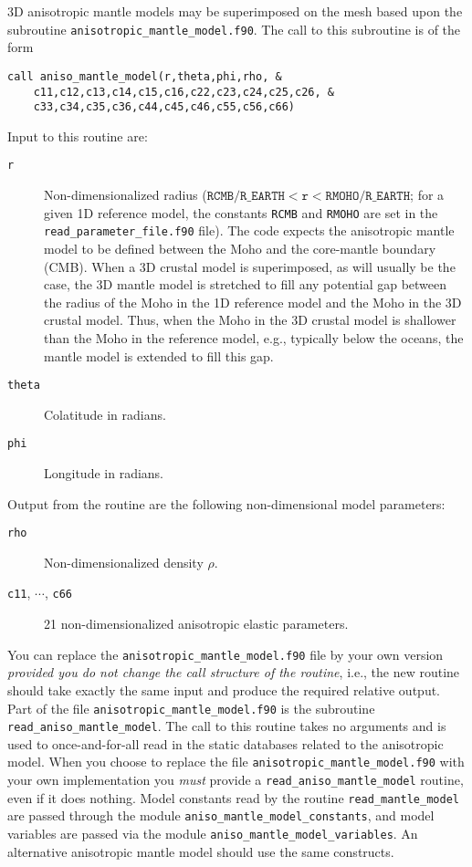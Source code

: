 \documentclass[onecolumn]{article}
\begin{document}
3D anisotropic mantle models may be superimposed on the mesh based
upon the subroutine \texttt{anisotropic\_mantle\_model.f90}.
The call to this subroutine is of the form
\begin{verbatim}
call aniso_mantle_model(r,theta,phi,rho, &
    c11,c12,c13,c14,c15,c16,c22,c23,c24,c25,c26, &
    c33,c34,c35,c36,c44,c45,c46,c55,c56,c66)
\end{verbatim}
Input to this routine are:
\begin{description}
\item[\texttt{r}] Non-dimensionalized radius
($\texttt{RCMB/R\_EARTH}<\texttt{r}<\texttt{RMOHO/R\_EARTH}$;
for a given 1D reference model,
the constants \texttt{RCMB} and \texttt{RMOHO} are set in the
\texttt{read\_parameter\_file.f90} file).
The code expects the anisotropic mantle model to be defined between the Moho
and the core-mantle boundary (CMB).
When a 3D crustal model is superimposed, as will usually
be the case, the 3D mantle model is stretched to fill any potential
gap between the radius of the Moho in the 1D reference model
and the Moho in the 3D crustal model.
Thus, when the Moho in the 3D crustal model is shallower than the Moho in
the reference model, e.g., typically below the oceans,
the mantle model is extended to fill this gap.
\item[\texttt{theta}] Colatitude in radians.
\item[\texttt{phi}] Longitude in radians.
\end{description}
Output from the routine are the following non-dimensional model parameters:
\begin{description}
\item[\texttt{rho}] Non-dimensionalized density $\rho$.
\item[\texttt{c11}, $\cdots$, \texttt{c66}] 21 non-dimensionalized
anisotropic elastic parameters.
\end{description}
You can replace the \texttt{anisotropic\_mantle\_model.f90} file by your own version
\textit{provided you do not change the call structure of the routine},
i.e., the new routine should take exactly the same input and
produce the required relative output.
Part of the file \texttt{anisotropic\_mantle\_model.f90} is the
subroutine \texttt{read\_aniso\_mantle\_model}.
The call to this routine takes no arguments and is used to once-and-for-all
read in the static databases related to the anisotropic model.
When you choose to replace
the file \texttt{anisotropic\_mantle\_model.f90} with your own implementation you
\textit{must} provide a \texttt{read\_aniso\_mantle\_model} routine,
even if it does nothing.
Model constants read by the routine \texttt{read\_mantle\_model}
are passed through
the module \texttt{aniso\_mantle\_model\_constants},
and model variables are passed via the module
\texttt{aniso\_mantle\_model\_variables}.
An alternative anisotropic mantle model should use the same constructs.
\end{document}
